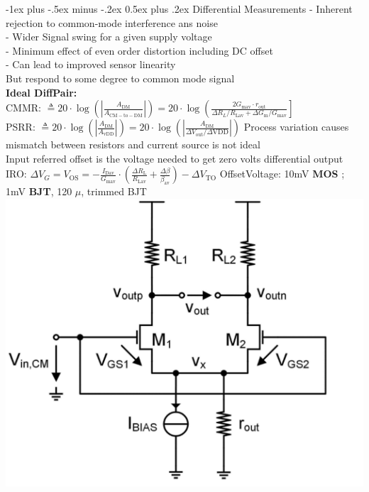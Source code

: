 \documentclass[5pt,landscape]{article}
\makeatletter
\renewcommand{\section}{\@startsection{section}{1}{0mm}%
                                {-1ex plus -.5ex minus -.2ex}%
                                {0.5ex plus .2ex}%
                                {\normalfont\large\bfseries}}
\makeatother
\begin{document}
\begin{multicols*}{5}
\section{Differential Measurements}
- Inherent rejection to common-mode interference ans noise\\
- Wider Signal swing for a given supply voltage\\
- Minimum effect of even order distortion including DC offset\\
- Can lead to improved sensor linearity \\
But respond to some degree to common mode signal\\
\textbf{Ideal DiffPair:}\\
CMMR: $  \triangleq 20 \cdot \log \left(\left|\frac{A_{\mathrm{DM}}}{A_{\mathrm{CM}-\mathrm{to}-\mathrm{DM}}}\right|\right) =20 \cdot \log \left(\frac{2 G_{\operatorname{mav}} \cdot r_{\mathrm{out}}}{\Delta R_{L} / R_{\mathrm{Lav}}+\Delta G_{\mathrm{m}} / G_{\mathrm{mav}}}\right] $\\
PSRR: $ \triangleq 20 \cdot \log \left(\left|\frac{A_{\mathrm{DM}}}{A_{\mathrm{vDD}}}\right|\right)=20 \cdot \log \left(\left|\frac{A_{\mathrm{DM}}}{\Delta V_{\mathrm{out}} / \Delta \mathrm{VDD}}\right|\right) $
Process variation causes mismatch between resistors and current source is not ideal\\
Input referred offset is the voltage needed to get zero volts differential output\\
IRO: $ \Delta V_{G}=V_{\mathrm{OS}}=-\frac{I_{\mathrm{Dav}}}{G_{\mathrm{mav}}} \cdot\left(\frac{\Delta R_{\mathrm{L}}}{R_{\mathrm{Lav}}}+\frac{\Delta \beta}{\beta_{\mathrm{av}}}\right)-\Delta V_{\mathrm{TO}} $
OffsetVoltage: 10mV \textbf{MOS} ; 1mV \textbf{BJT}, 120 $ \mu  $, trimmed BJT
\includegraphics[width=\columnwidth]{images/cmrr_diff_pair.png}\\

\end{multicols*}
\end{document}
